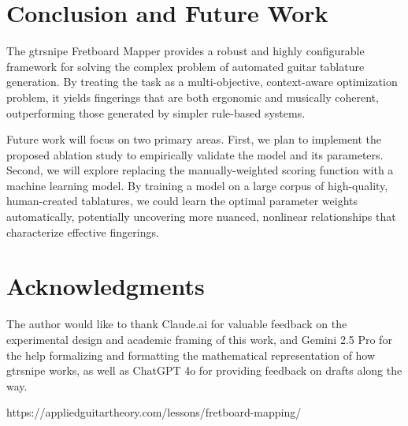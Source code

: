 \documentclass[conference]{IEEEtran}
\begin{document}
\section{Conclusion and Future Work}

The gtrsnipe Fretboard Mapper provides a robust and highly configurable framework for solving the complex problem of automated guitar tablature generation. By treating the task as a multi-objective, context-aware optimization problem, it yields fingerings that are both ergonomic and musically coherent, outperforming those generated by simpler rule-based systems.

Future work will focus on two primary areas. First, we plan to implement the proposed ablation study to empirically validate the model and its parameters. Second, we will explore replacing the manually-weighted scoring function with a machine learning model. By training a model on a large corpus of high-quality, human-created tablatures, we could learn the optimal parameter weights automatically, potentially uncovering more nuanced, nonlinear relationships that characterize effective fingerings.

\section*{Acknowledgments}
The author would like to thank Claude.ai for valuable feedback on the experimental design and academic framing of this work, and Gemini 2.5 Pro for the help formalizing and formatting the mathematical representation of how gtrsnipe works, as well as ChatGPT 4o for providing feedback on drafts along the way.

\begin{thebibliography}{1}

https://appliedguitartheory.com/lessons/fretboard-mapping/
\end{thebibliography}
\end{document}
